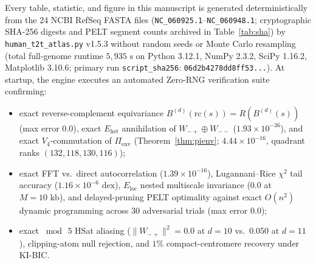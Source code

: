 \documentclass[11pt,a4paper]{article}
\newcommand{\Wmp}{W_{-+}}
\newcommand{\Wmm}{W_{--}}
\newcommand{\Pienv}{\Pi_{\mathrm{env}}}
\begin{document}
Every table, statistic, and figure in this manuscript is generated deterministically from the 24 NCBI RefSeq FASTA files (\texttt{NC\_060925.1}--\texttt{NC\_060948.1}; cryptographic SHA-256 digests and PELT segment counts archived in Table~\ref{tab:sha}) by \texttt{human\_t2t\_atlas.py} v1.5.3 without random seeds or Monte Carlo resampling (total full-genome runtime $5{,}935\text{ s}$ on Python 3.12.1, NumPy 2.3.2, SciPy 1.16.2, Matplotlib 3.10.6; primary run \texttt{script\_sha256}: \texttt{06d2b4278dd8ff53...}). At startup, the engine executes an automated Zero-RNG verification suite confirming:
\begin{itemize}
  \item exact reverse-complement equivariance $B^{(d)}(\mathrm{rc}(s)) = R(B^{(d)}(s))$ (max error $0.0$), exact $E_{\mathrm{het}}$ annihilation of $\Wmp\oplus\Wmm$ ($1.93\times 10^{-36}$), and exact $V_4$-commutation of $\Pienv$ (Theorem~\ref{thm:pienv}; $4.44\times 10^{-16}$, quadrant ranks $(132,118,130,116)$);
  \item exact FFT vs.\ direct autocorrelation ($1.39\times 10^{-16}$), Lugannani--Rice $\chi^2$ tail accuracy ($1.16\times 10^{-6}\text{ dex}$), $E_{\mathrm{loc}}$ nested multiscale invariance ($0.0$ at $M=10\text{ kb}$), and delayed-pruning PELT optimality against exact $O(n^2)$ dynamic programming across 30 adversarial trials (max error $0.0$);
  \item exact $\bmod\,5$ HSat aliasing ($\|\Wmp\|^2 = 0.0$ at $d=10$ vs.\ $0.050$ at $d=11$), clipping-atom null rejection, and $1\%$ compact-centromere recovery under KI-BIC.
\end{itemize}
\end{document}

